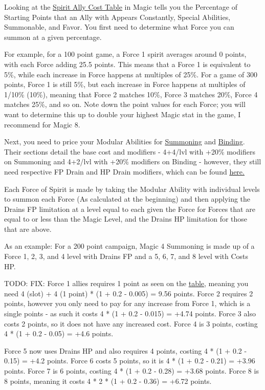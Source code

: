 \begin{multicols*}{2}
	Looking at the \hyperref[spirit_ally_cost]{Spirit Ally Cost Table} in Magic tells you the Percentage of Starting Points that an Ally with Appears Constantly, Special Abilities, Summonable, and Favor. You first need to determine what Force you can summon at a given percentage.
	
	For example, for a 100 point game, a Force 1 spirit averages around 0 points, with each Force adding 25.5 points. This means that a Force 1 is equivalent to 5\%, while each increase in Force happens at multiples of 25\%. For a game of 300 points, Force 1 is still 5\%, but each increase in Force happens at multiples of 1/10\% (10\%), meaning that Force 2 matches 10\%, Force 3 matches 20\%, Force 4 matches 25\%, and so on. Note down the point values for each Force; you will want to determine this up to double your highest Magic stat in the game, I recommend for Magic 8.
	
	Next, you need to price your Modular Abilities for \hyperref[summoning]{Summoning} and \hyperref[binding]{Binding}. Their sections detail the base cost and modifiers - 4+4/lvl with +20\% modifiers on Summoning and 4+2/lvl with +20\% modifiers on Binding - however, they still need respective FP Drain and HP Drain modifiers, which can be found \hyperref[drain_mods]{here.}
	
	Each Force of Spirit is made by taking the Modular Ability with individual levels to summon each Force (As calculated at the beginning) and then applying the Drains FP limitation at a level equal to each given the Force for Forces that are equal to or less than the Magic Level, and the Drains HP limitation for those that are above. 
	
	As an example: For a 200 point campaign, Magic 4 Summoning is made up of a Force 1, 2, 3, and 4 level with Drains FP and a 5, 6, 7, and 8 level with Costs HP. 
	
	
	
	TODO: FIX: Force 1 allies requires 1 point as seen on the \hyperref[spirit_ally_cost]{table}, meaning you need 4 (slot) + 4 (1 point) * (1 + 0.2 - 0.005) = 9.56 points. Force 2 requires 2 points, however you only need to pay for any increase from Force 1, which is a single points - as such it costs 4 * (1 + 0.2 - 0.015) = +4.74 points. Force 3 also costs 2 points, so it does not have any increased cost. Force 4 is 3 points, costing 4 * (1 + 0.2 - 0.05) = +4.6 points. 
	
	Force 5 now uses Drains HP and also requires 4 points, costing 4 * (1 + 0.2 - 0.15) = +4.2 points. Force 6 costs 5 points, so it is 4 * (1 + 0.2 - 0.21) = +3.96 points. Force 7 is 6 points, costing 4 * (1 + 0.2 - 0.28) = +3.68 points. Force 8 is 8 points, meaning it costs 4 * 2 * (1 + 0.2 - 0.36) = +6.72 points.
	

\end{multicols*}

